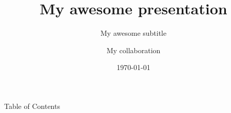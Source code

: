 \documentclass[10pt]{beamer}
\title{My awesome presentation}
\subtitle{My awesome subtitle}
\author[My collaboration]{My collaboration}
\date{\today}
\begin{document}
\begin{frame}
  \titlepage
\end{frame}

\begin{frame}{Table of Contents}
    \begin{multicols}{2}
        \tableofcontents
    \end{multicols}
\end{frame}


\end{document}
